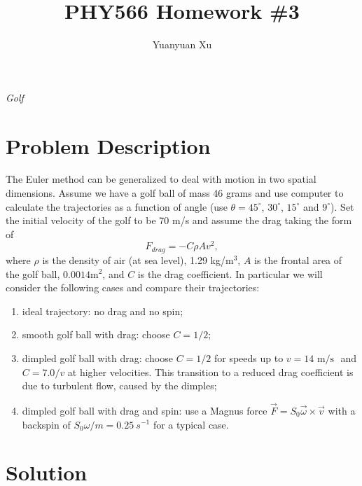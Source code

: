 \documentclass[a4paper]{article}
\title{\textbf{PHY566 Homework \#3}}
\author{Yuanyuan Xu}
\begin{document}
	\maketitle
	\centerline{\emph{\Large{Golf}}}
	\section{Problem Description}
	The Euler method can be generalized to deal with motion in two spatial dimensions. Assume we have a golf ball of mass 46 grams and use computer to calculate the trajectories as a function of angle (use $\theta = 45^{\circ}$, $30^{\circ}$, $15^{\circ}$ and $9^{\circ}$). Set the initial velocity of the golf to be 70 m/s and assume the drag taking the form of
	\begin{equation} \label{drag}
		F_{drag} = - C \rho A v^2,
	\end{equation}
	where $\rho$ is the density of air (at sea level), 1.29 kg/$\textrm{m}^3$, $A$ is the frontal area of the golf ball, $0.0014\textrm{m}^2$, and $C$ is the drag coefficient. In particular we will consider the following cases and compare their trajectories:
	\begin{enumerate}[label=\alph*)]
		\item ideal trajectory: no drag and no spin;
		\item smooth golf ball with drag: choose $C = 1 / 2$;
		\item dimpled golf ball with drag: choose $C = 1 / 2$ for speeds up to $v = 14 \textrm{~m/s	}$ and $C = 7.0 / v$ at higher velocities. This transition to a reduced drag coefficient is due to turbulent flow, caused by the dimples;
		\item dimpled golf ball with drag and spin: use a Magnus force $\vec{F} = S_0 \vec{\omega} \times \vec{v}$ with a backspin of $S_0 \omega / m = 0.25 ~s^{-1}$ for a typical case.
	\end{enumerate}
	
	\section{Solution}
\end{document}
